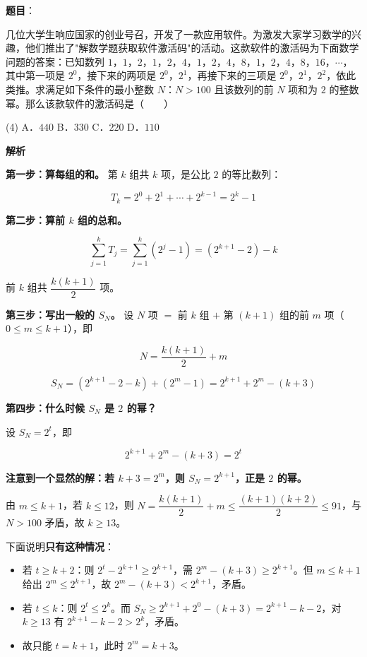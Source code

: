 \begin{answer}

\textbf{题目}：

几位大学生响应国家的创业号召，开发了一款应用软件。为激发大家学习数学的兴趣，他们推出了"解数学题获取软件激活码"的活动。这款软件的激活码为下面数学问题的答案：已知数列 $1$，$1$，$2$，$1$，$2$，$4$，$1$，$2$，$4$，$8$，$1$，$2$，$4$，$8$，$16$，$\cdots$，其中第一项是 $2^{0}$，接下来的两项是 $2^{0}$，$2^{1}$，再接下来的三项是 $2^{0}$，$2^{1}$，$2^{2}$，依此类推。求满足如下条件的最小整数 $N$：$N>100$ 且该数列的前 $N$ 项和为 $2$ 的整数幂。那么该款软件的激活码是\mbox{（　　）}

\begin{gkopts}(4)
\task A．$440$
\task B．$330$
\task C．$220$
\task D．$110$
\end{gkopts}

\textbf{解析}

\textbf{第一步：算每组的和。} 第 $k$ 组共 $k$ 项，是公比 $2$ 的等比数列：

\nopagebreak[4]
\[T_k=2^{0}+2^{1}+\cdots+2^{k-1}=2^{k}-1\]

\textbf{第二步：算前 $k$ 组的总和。}

\nopagebreak[4]
\[\sum_{j=1}^{k}T_j=\sum_{j=1}^{k}\left(2^{j}-1\right)=\left(2^{k+1}-2\right)-k\]

前 $k$ 组共 $\dfrac{k(k+1)}2$ 项。

\textbf{第三步：写出一般的 $S_N$。} 设 $N$ 项 $=$ 前 $k$ 组 $+$ 第 $(k+1)$ 组的前 $m$ 项（$0\le m\le k+1$），即

\nopagebreak[4]
\[N=\frac{k(k+1)}2+m\]

\nopagebreak[4]
\[S_N=\left(2^{k+1}-2-k\right)+\left(2^{m}-1\right)=2^{k+1}+2^{m}-(k+3)\]

\textbf{第四步：什么时候 $S_N$ 是 $2$ 的幂？}

设 $S_N=2^{t}$，即

\nopagebreak[4]
\[2^{k+1}+2^{m}-(k+3)=2^{t}\]

\textbf{注意到一个显然的解：若 $k+3=2^{m}$，则 $S_N=2^{k+1}$，正是 $2$ 的幂。}

由 $m\le k+1$，若 $k\le12$，则 $N=\dfrac{k(k+1)}2+m\le\dfrac{(k+1)(k+2)}2\le91$，与 $N>100$ 矛盾，故 $k\ge13$。

下面说明\textbf{只有这种情况}：

\begin{itemize}
\item 若 $t\ge k+2$：则 $2^{t}-2^{k+1}\ge2^{k+1}$，需 $2^{m}-(k+3)\ge2^{k+1}$。但 $m\le k+1$ 给出 $2^{m}\le2^{k+1}$，故 $2^{m}-(k+3)<2^{k+1}$，矛盾。
\item 若 $t\le k$：则 $2^{t}\le2^{k}$。而 $S_N\ge2^{k+1}+2^{0}-(k+3)=2^{k+1}-k-2$，对 $k\ge13$ 有 $2^{k+1}-k-2>2^{k}$，矛盾。
\item 故只能 $t=k+1$，此时 $2^{m}=k+3$。
\end{itemize}


\end{answer}
